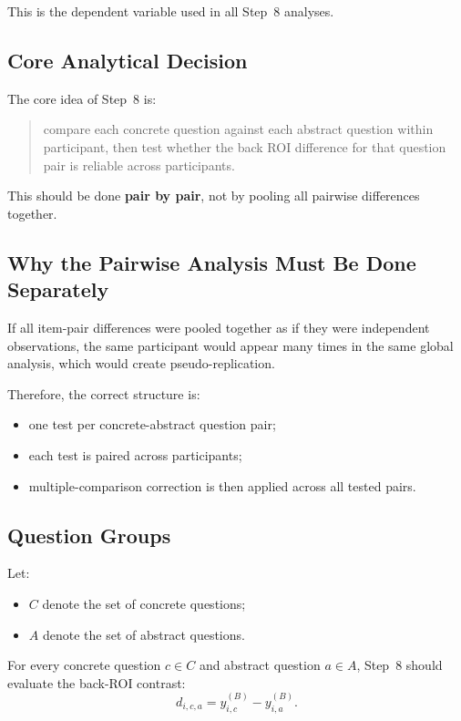 \documentclass[11pt]{article}
\begin{document}
This is the dependent variable used in all Step~8 analyses.

\subsection{Core Analytical Decision}
The core idea of Step~8 is:
\begin{quote}
compare each concrete question against each abstract question within participant,
then test whether the back ROI difference for that question pair is reliable across participants.
\end{quote}

This should be done \textbf{pair by pair}, not by pooling all pairwise differences together.

\subsection{Why the Pairwise Analysis Must Be Done Separately}
If all item-pair differences were pooled together as if they were independent observations,
the same participant would appear many times in the same global analysis, which would create
pseudo-replication.

Therefore, the correct structure is:
\begin{itemize}
    \item one test per concrete-abstract question pair;
    \item each test is paired across participants;
    \item multiple-comparison correction is then applied across all tested pairs.
\end{itemize}

\subsection{Question Groups}
Let:
\begin{itemize}
    \item \(C\) denote the set of concrete questions;
    \item \(A\) denote the set of abstract questions.
\end{itemize}

For every concrete question \(c \in C\) and abstract question \(a \in A\),
Step~8 should evaluate the back-ROI contrast:
\begin{equation}
d_{i,c,a} = y^{(B)}_{i,c} - y^{(B)}_{i,a}.
\end{equation}
\end{document}
